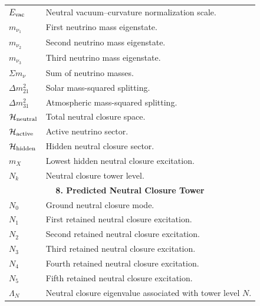 \documentclass[11pt]{article}
\theoremstyle{definition}
\theoremstyle{remark}
\begin{document}
\begin{longtable}{p{}p{}}
$E_{\rm vac}$ & Neutral vacuum--curvature normalization scale. \\

$m_{\nu_1}$ & First neutrino mass eigenstate. \\

$m_{\nu_2}$ & Second neutrino mass eigenstate. \\

$m_{\nu_3}$ & Third neutrino mass eigenstate. \\

$\Sigma m_\nu$ & Sum of neutrino masses. \\

$\Delta m_{21}^{2}$ & Solar mass-squared splitting. \\

$\Delta m_{31}^{2}$ & Atmospheric mass-squared splitting. \\

$\mathcal H_{\rm neutral}$ & Total neutral closure space. \\

$\mathcal H_{\rm active}$ & Active neutrino sector. \\

$\mathcal H_{\rm hidden}$ & Hidden neutral closure sector. \\

$m_X$ & Lowest hidden neutral closure excitation. \\

$N_k$ & Neutral closure tower level. \\

\hline
\multicolumn{2}{c}{\textbf{8. Predicted Neutral Closure Tower}} \\
\hline

$N_0$ & Ground neutral closure mode. \\

$N_1$ & First retained neutral closure excitation. \\

$N_2$ & Second retained neutral closure excitation. \\

$N_3$ & Third retained neutral closure excitation. \\

$N_4$ & Fourth retained neutral closure excitation. \\

$N_5$ & Fifth retained neutral closure excitation. \\

$\Lambda_N$ & Neutral closure eigenvalue associated with tower level $N$. \\

\end{longtable}
\end{document}
